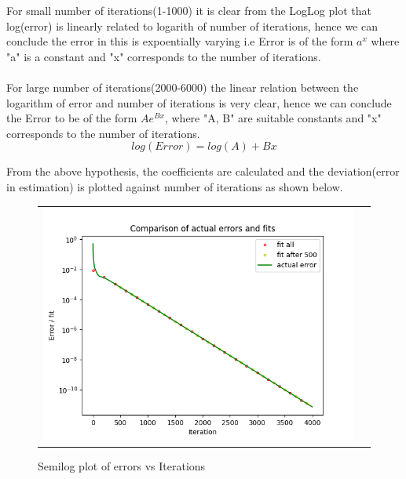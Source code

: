 \documentclass[11pt, a4paper]{article}
\begin{document}
          For small number of iterations(1-1000) it is clear from the LogLog plot that log(error) is linearly related to logarith of number of iterations, hence we can conclude the error in this is expoentially varying i.e Error is of the form \(a^x\) where "a" is a constant and "x" corresponds to the number of iterations.\\
          \\ For large number of iterations(2000-6000) the linear relation between the logarithm of error and number of iterations is very clear, hence we can conclude the Error to be of the form \(Ae^{Bx}\), where "A, B" are suitable constants and "x" corresponds to the number of iterations.
            \begin{equation}    
            log(Error) = log(A) + Bx
            \end{equation}
            
            From the above hypothesis, the coefficients are calculated and the deviation(error in estimation) is plotted against number of iterations as shown below.
            
             \begin{figure}[H]
                    \centering
                    \setlength\tabcolsep{2pt}
                    \begin{tabular}{cc}
                       \includegraphics[scale=0.9]{Fig4.png}
                    \end{tabular}
                    \caption{Semilog plot of errors vs Iterations} 
                \end{figure}
 		
\end{document}
